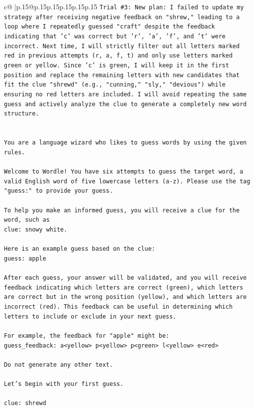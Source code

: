 \documentclass{article}
\begin{document}
{\begin{supertabular}{c@{$\;$}|p{.15\linewidth}@{}p{.15\linewidth}p{.15\linewidth}p{.15\linewidth}p{.15\linewidth}p{.15\linewidth}}
{{{\texttt{Trial \#3: New plan: I failed to update my strategy after receiving negative feedback on "shrew," leading to a loop where I repeatedly guessed "craft" despite the feedback indicating that 'c' was correct but 'r', 'a', 'f', and 't' were incorrect. Next time, I will strictly filter out all letters marked red in previous attempts (r, a, f, t) and only use letters marked green or yellow. Since 'c' is green, I will keep it in the first position and replace the remaining letters with new candidates that fit the clue "shrewd" (e.g., "cunning," "sly," "devious") while ensuring no red letters are included. I will avoid repeating the same guess and actively analyze the clue to generate a completely new word structure.} \\
\\ 
\\ 
\texttt{You are a language wizard who likes to guess words by using the given rules.} \\
\\ 
\texttt{Welcome to Wordle! You have six attempts to guess the target word, a valid English word of five lowercase letters (a{-}z). Please use the tag "guess:" to provide your guess.} \\
\\ 
\texttt{To help you make an informed guess, you will receive a clue for the word, such as} \\
\texttt{clue: snowy white.} \\
\\ 
\texttt{Here is an example guess based on the clue: } \\
\texttt{guess: apple} \\
\\ 
\texttt{After each guess, your answer will be validated, and you will receive feedback indicating which letters are correct (green), which letters are correct but in the wrong position (yellow), and which letters are incorrect (red). This feedback can be useful in determining which letters to include or exclude in your next guess.} \\
\\ 
\texttt{For example, the feedback for "apple" might be:} \\
\texttt{guess\_feedback: a<yellow> p<yellow> p<green> l<yellow> e<red>} \\
\\ 
\texttt{Do not generate any other text.} \\
\\ 
\texttt{Let's begin with your first guess.} \\
\\ 
\texttt{clue: shrewd} \\
            }
        }
    }
     \\ \\


\end{supertabular}}
\end{document}
